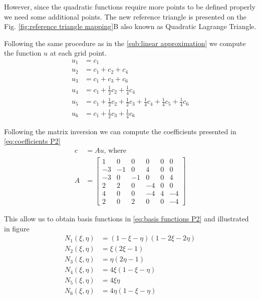 \documentclass[acmsmall,screen]{MapleTrans}
\begin{document}
However, since the quadratic functions require more points to be defined properly we need some additional points. The new reference triangle is presented on the Fig. \ref{fig:reference triangle mapping}B also known as Quadratic Lagrange Triangle.

Following the same procedure as in the \ref{sub:linear approximation} we compute the function $u$ at each grid point.
\begin{equation}
\begin{aligned}
    u_1 &= c_1 \\
    u_2 &= c_1 + c_2 + c_4 \\
    u_3 &= c_1 + c_3 + c_6 \\
    u_4 &= c_1 + \frac{1}{2}c_2 + \frac{1}{4}c_4 \\
    u_5 &= c_1 + \frac{1}{2}c_2 + \frac{1}{2}c_3 + \frac{1}{4}c_4 + \frac{1}{4}c_5 + \frac{1}{4}c_6 \\
    u_6 &= c_1 + \frac{1}{2}c_3 + \frac{1}{4}c_6
\end{aligned}
\end{equation}

Following the matrix inversion we can compute the coefficients presented in \eqref{eq:coefficients P2}
\begin{equation}
\begin{aligned}
    c &= Au \text{, where}\\
    A &= \begin{bmatrix}
        1 & 0 & 0 & 0 & 0 & 0 \\
        -3 & -1 & 0 & 4 & 0 & 0 \\
        -3 & 0 & -1 & 0 & 0 & 4 \\
        2 & 2 & 0 & -4 & 0 & 0 \\
        4 & 0 & 0 & -4 & 4 & -4 \\
        2 & 0 & 2 & 0 & 0 & -4
    \end{bmatrix}
    \label{eq:coefficients P2}
\end{aligned}
\end{equation}

This allow us to obtain basis functions in \eqref{eq:basis functions P2} and illustrated in figure
\begin{equation}
\begin{aligned}
    N_1(\xi, \eta) &= (1 - \xi - \eta)(1 - 2\xi - 2\eta) \\
    N_2(\xi, \eta) &= \xi(2\xi - 1) \\
    N_3(\xi, \eta) &= \eta(2\eta - 1) \\
    N_4(\xi, \eta) &= 4\xi(1 - \xi - \eta) \\
    N_5(\xi, \eta) &= 4\xi\eta \\
    N_6(\xi, \eta) &= 4\eta(1 - \xi - \eta)
    \label{eq:basis functions P2}
\end{aligned}
\end{equation}
\end{document}
